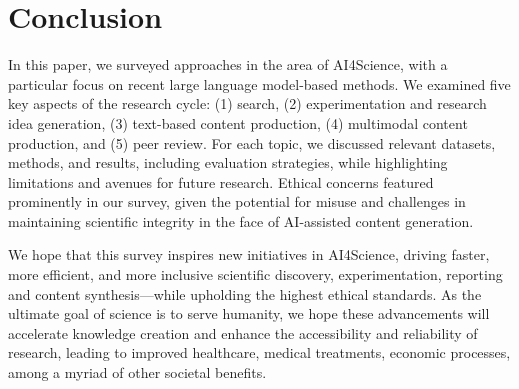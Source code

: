 \section{Conclusion}\label{sec:conclusion}


In this paper, we surveyed approaches in the area of AI4Science, with a particular focus on recent large language model-based methods. We examined five key aspects of the research cycle: (1) search, (2) experimentation and research idea generation, (3) text-based content production, (4) multimodal content production, and (5) peer review. For each topic, we discussed relevant datasets, methods, and results, including evaluation strategies, while highlighting limitations and avenues for future research. Ethical concerns featured prominently in our survey, given the potential for misuse and challenges in maintaining scientific integrity in the face of AI-assisted content generation.

We hope that this survey inspires new initiatives in AI4Science, driving faster, more efficient, and more inclusive scientific discovery, experimentation, reporting and content synthesis---while upholding the highest ethical standards. %
As the ultimate goal of science is to serve humanity, we hope these advancements will accelerate knowledge creation and enhance the accessibility and reliability of research, leading to improved healthcare, medical treatments, economic processes, among a myriad of other societal benefits.
